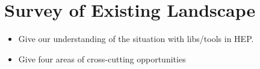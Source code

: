 \section{Survey of Existing Landscape}

\begin{itemize}
\item Give our understanding of the situation with libs/tools in HEP.
\item Give four areas of cross-cutting opportunities
\end{itemize}







